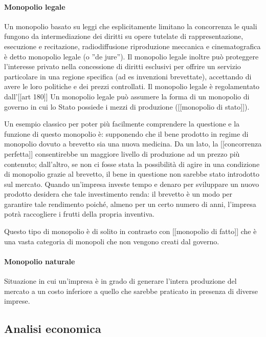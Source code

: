 \paragraph{Monopolio legale}
Un monopolio basato su leggi che esplicitamente limitano la concorrenza le 
quali fungono da intermediazione dei diritti su opere tutelate di 
rappresentazione, esecuzione e recitazione, radiodiffusione riproduzione 
meccanica e cinematografica è detto monopolio legale (o ''de jure''). Il 
monopolio legale inoltre può proteggere l'interesse privato nella concessione 
di diritti esclusivi per offrire un servizio particolare in una regione 
specifica (ad es invenzioni brevettate), accettando di avere le loro politiche 
e dei prezzi controllati. Il monopolio legale è regolamentato dall'[[art 180]]
Un monopolio legale può assumere la forma di un monopolio di governo in cui lo 
Stato possiede i mezzi di produzione ([[monopolio di stato]]).

Un esempio classico per poter più facilmente comprendere la questione e la 
funzione di questo monopolio è: supponendo che il bene prodotto in regime di 
monopolio dovuto a brevetto sia una nuova medicina. Da un lato, la 
[[concorrenza perfetta]] consentirebbe un maggiore livello di produzione ad un 
prezzo più contenuto; dall'altro, se non ci fosse stata la possibilità di agire 
in una condizione di monopolio grazie al brevetto, il bene in questione non 
sarebbe stato introdotto sul mercato. Quando un'impresa investe tempo e denaro 
per sviluppare un nuovo prodotto desidera che tale investimento renda: il 
brevetto è un modo per garantire tale rendimento poiché, almeno per un certo 
numero di anni, l'impresa potrà raccogliere i frutti della propria inventiva.

Questo tipo di monopolio è di solito in contrasto con [[monopolio di fatto]] 
che è una vasta categoria di monopoli che non vengono creati dal governo.

\paragraph{Monopolio naturale}
Situazione in cui un'impresa è in grado di 
generare l'intera produzione del mercato a un costo inferiore a quello che 
sarebbe praticato in presenza di diverse imprese. 


\subsection{Analisi economica}


